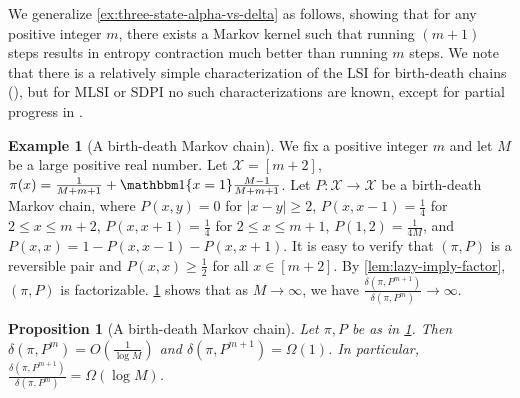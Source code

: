 \documentclass[11pt]{article}
\def\cX{\mathcal{X}}
\newcommand{\nbyp}[1]{{\color{red}[Yury: #1]}}
\newtheorem{proposition}[theorem]{Proposition}
\theoremstyle{definition}
\newtheorem{example}[theorem]{Example}
\begin{document}
We generalize \cref{ex:three-state-alpha-vs-delta} as follows, showing that for any positive
integer $m$, there exists a Markov kernel such that running $(m+1)$ steps results in entropy
contraction much better than running $m$ steps.
We note that there is a relatively simple characterization of the LSI for birth-death chains (\cite{chen2005poincare,chen2003variational}), but for MLSI or SDPI no such characterizations are known, except for partial progress in \cite{roberto2001inegalites,caputo2009convex}.
\begin{example}[A birth-death Markov chain] \label{ex:birth-death}
  We fix a positive integer $m$ and let $M$ be a large positive real number.
  Let $\cX = [m+2]$, $\pi(x)= \frac 1{M+m+1} + \mathbbm1\{x=1\} \frac{M-1}{M+m+1}$.
  Let $P: \cX \to \cX$ be a birth-death Markov chain, where $P(x,y)=0$ for $|x-y|\ge 2$, $P(x,x-1)=\frac 14$ for $2\le x\le m+2$, $P(x,x+1)=\frac 14$ for $2\le x\le m+1$, $P(1,2)=\frac 1{4M}$, and $P(x,x)=1-P(x,x-1)-P(x,x+1)$.
  It is easy to verify that $(\pi, P)$ is a reversible pair and $P(x,x)\ge \frac 12$ for all $x\in [m+2]$.
  By \cref{lem:lazy-imply-factor}, $(\pi, P)$ is factorizable.
  \cref{prop:birth-death} shows that as $M\to \infty$, we have $\frac{\delta\left(\pi, P^{m+1}\right)}{\delta\left(\pi, P^m\right)} \to \infty$.
\end{example}
\begin{proposition}[A birth-death Markov chain] \label{prop:birth-death}
  Let $\pi, P$ be as in \cref{ex:birth-death}.
  Then $\delta\left(\pi, P^m\right) = O\left( \frac 1{\log M}\right)$ and $\delta\left(\pi, P^{m+1}\right) = \Omega(1)$.
  In particular, $\frac{\delta\left(\pi, P^{m+1}\right)}{\delta\left(\pi, P^m\right)} = \Omega(\log M)$.
\end{proposition}
\end{document}
